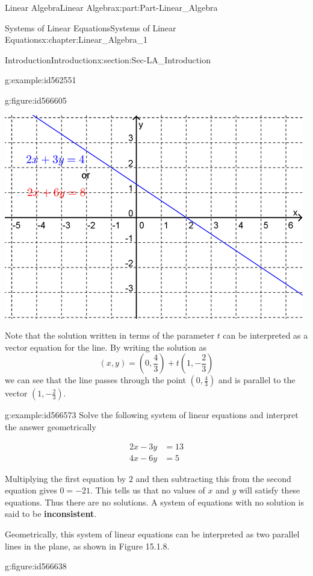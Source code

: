 \documentclass[oneside,10pt,]{book}
\newcommand{\terminology}[1]{\textbf{#1}}
\numberwithin{equation}{section}
\newcommand{\amp}{&}
\begin{document}
\begin{partptx}{Linear Algebra}{}{Linear Algebra}{}{}{x:part:Part-Linear_Algebra}
\begin{chapterptx}{Systems of Linear Equations}{}{Systems of Linear Equations}{}{}{x:chapter:Linear_Algebra_1}
\begin{sectionptx}{Introduction}{}{Introduction}{}{}{x:section:Sec-LA_Introduction}
\begin{example}{}{g:example:id562551}
\begin{figureptx}{}{g:figure:id566605}{}
\begin{image}{0.2}{0.6}{0.2}%
\includegraphics[width=\linewidth]{./LinearAlgebra/Images/1/figure2.png}
\end{image}%
\tcblower
\end{figureptx}%
 Note that the solution written in terms of the parameter \(t\) can be interpreted as a vector equation for the line. By writing the solution as%
\begin{equation*}
(x,y)=\left(0,\frac{4}{3}\right)+t\left(1,-\frac{2}{3}\right)
\end{equation*}
we can see that the line passes through the point \(\left(0,\frac{4}{3}\right)\) and is parallel to the vector \(\left(1,-\frac{2}{3}\right)\).%
\end{example}
\begin{example}{}{g:example:id566573}%
Solve the following system of linear equations and interpret the answer geometrically%
\par
%
\begin{align*}
2x-3y \amp =13\\
4x-6y \amp =5
\end{align*}
%
\par\smallskip%
\noindent\hypertarget{g:solution:id566613}{}Multiplying the first equation by \(2\) and then subtracting this from the second equation gives \(0=-21\). This tells us that no values of \(x\) and \(y\) will satisfy these equations. Thus there are no solutions. A system of equations with no solution is said to be \terminology{inconsistent}.%
\par
Geometrically, this system of linear equations can be interpreted as two parallel lines in the plane, as shown in Figure 15.1.8. \begin{figureptx}{}{g:figure:id566638}{}%

\end{figureptx}
\end{example}
\end{sectionptx}
\end{chapterptx}
\end{partptx}
\end{document}
